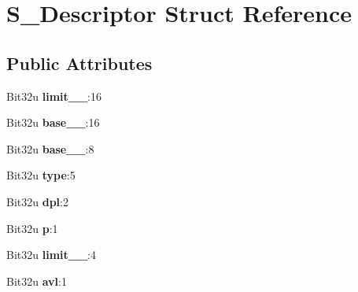 \hypertarget{structS__Descriptor}{\section{S\-\_\-\-Descriptor Struct Reference}
\label{structS__Descriptor}
}
\subsection*{Public Attributes}
\begin{DoxyCompactItemize}
\item 
\hypertarget{structS__Descriptor_a77620422e4949b1adb45e25a197cdc39}{Bit32u {\bfseries limit\-\_\-\_}\-:16}\label{structS__Descriptor_a77620422e4949b1adb45e25a197cdc39}

\item 
\hypertarget{structS__Descriptor_a7bc82a64f3e5a71596f40b55fc1a5d4d}{Bit32u {\bfseries base\-\_\-\_}\-:16}\label{structS__Descriptor_a7bc82a64f3e5a71596f40b55fc1a5d4d}

\item 
\hypertarget{structS__Descriptor_a752dc56ba06fa3278e138d56a2580ba4}{Bit32u {\bfseries base\-\_\-\_}\-:8}\label{structS__Descriptor_a752dc56ba06fa3278e138d56a2580ba4}

\item 
\hypertarget{structS__Descriptor_a1041d68b4882ed6b8e3f8b774025c79f}{Bit32u {\bfseries type}\-:5}\label{structS__Descriptor_a1041d68b4882ed6b8e3f8b774025c79f}

\item 
\hypertarget{structS__Descriptor_af65969bbcfc3f0bcb84e2eac5dc028f1}{Bit32u {\bfseries dpl}\-:2}\label{structS__Descriptor_af65969bbcfc3f0bcb84e2eac5dc028f1}

\item 
\hypertarget{structS__Descriptor_a58cebe9c909c2a9d740030451b2004ea}{Bit32u {\bfseries p}\-:1}\label{structS__Descriptor_a58cebe9c909c2a9d740030451b2004ea}

\item 
\hypertarget{structS__Descriptor_a17164937c8b15ac46e37b4fef4c5f136}{Bit32u {\bfseries limit\-\_\-\_}\-:4}\label{structS__Descriptor_a17164937c8b15ac46e37b4fef4c5f136}

\item 
\hypertarget{structS__Descriptor_a81fb09780cc2234e0a0086e97ee975c9}{Bit32u {\bfseries avl}\-:1}\label{structS__Descriptor_a81fb09780cc2234e0a0086e97ee975c9}


\end{DoxyCompactItemize}
